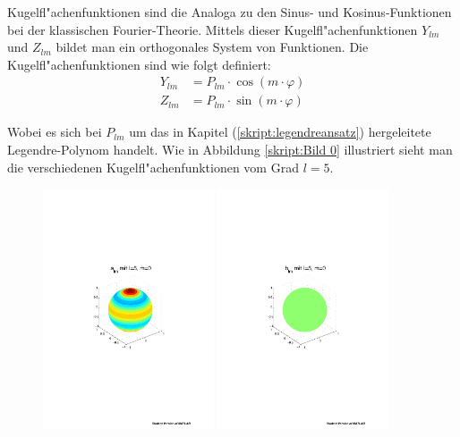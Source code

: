 \begin{refsection}
Kugelfl"achenfunktionen sind die Analoga zu den Sinus- und Kosinus-Funktionen bei der klassischen Fourier-Theorie. Mittels dieser Kugelfl"achenfunktionen $Y_{lm}$ und $Z_{lm}$ bildet man ein orthogonales System von Funktionen. Die Kugelfl"achenfunktionen sind wie folgt definiert:
\begin{align*}
Y_{lm}& = P_{lm} \cdot \cos(m \cdot \varphi)
\\
Z_{lm}& = P_{lm} \cdot \sin(m \cdot \varphi)
\end{align*}

Wobei es sich bei $P_{lm}$ um das in Kapitel (\ref{skript:legendreansatz}) hergeleitete Legendre-Polynom handelt. Wie in Abbildung \ref{skript:Bild 0} illustriert sieht man die verschiedenen Kugelfl"achenfunktionen vom Grad $l = 5$.

\begin{figure}%
\centering
\includegraphics[width=0.45\textwidth]{kugel/ylm/a_5_0.pdf}
\includegraphics[width=0.45\textwidth]{kugel/ylm/b_5_0.pdf}

\end{figure}
\end{refsection}
